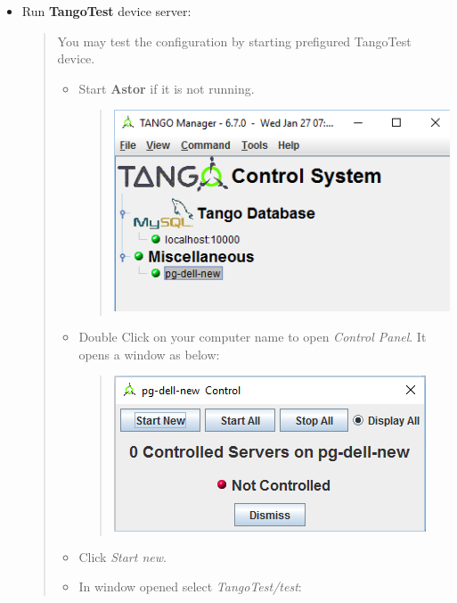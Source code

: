 \documentclass[letterpaper,10pt,english]{sphinxmanual}
\begin{document}
\begin{itemize}
\begin{description}
\end{description}

\item {} 
Run \textbf{TangoTest} device server:
\begin{quote}

You may test the configuration by starting prefigured TangoTest device.
\begin{itemize}
\item {} 
Start \textbf{Astor} if it is not running.
\begin{quote}

\includegraphics{device-server-01.png}
\end{quote}

\item {} 
Double Click on your computer name to open \emph{Control Panel}. It opens a window as below:
\begin{quote}

\includegraphics{device-server-02.png}
\end{quote}

\item {} 
Click \emph{Start new}.

\item {} 
In window opened select \emph{TangoTest/test}:
\begin{quote}


\end{quote}
\end{itemize}
\end{quote}
\end{itemize}
\end{document}
